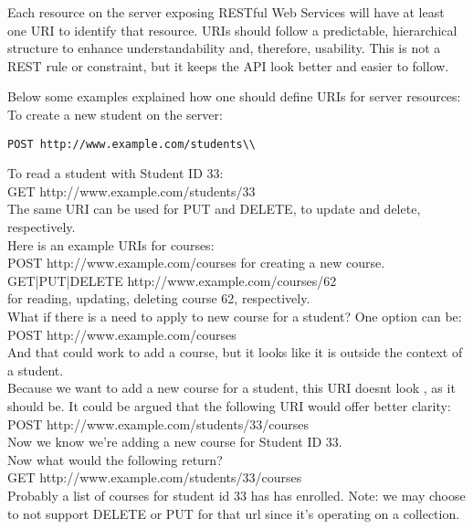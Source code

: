 \hspace*{0.2in}Each resource on the server exposing RESTful Web Services will have at least one URI to identify that resource. URIs should follow a predictable, hierarchical structure to enhance understandability and, therefore, usability. This is not a REST rule or constraint, but it keeps the API look better and easier to follow\cite{restnaming}.


Below some examples explained how one should define URIs for server resources:\\

To create a new student on the server:\\
\begin{lstlisting}[language=command]
	POST http://www.example.com/students\\
\end{lstlisting}

To read a student with Student ID 33:\\
GET http://www.example.com/students/33 \\
The same URI can be used for PUT and DELETE, to update and delete, respectively.\\

Here is an example URIs for courses:\\
POST http://www.example.com/courses for creating a new course.\\

GET|PUT|DELETE http://www.example.com/courses/62\\
for reading, updating, deleting course 62, respectively.\\

What if there is a need to apply to new course for a student? One option can be: \\
POST http://www.example.com/courses \\
And that could work to add a course, but it looks like it is outside the context of a student.\\

Because we want to add a new course for a student, this URI doesnt look , as it should be. It could be argued that the following URI would offer better clarity: \\
POST http://www.example.com/students/33/courses \\
Now we know we're adding a new course for Student ID 33.\\

Now what would the following return?\\
GET http://www.example.com/students/33/courses\\
Probably a list of courses for student id 33 has has enrolled. Note: we may choose to not support DELETE or PUT for that url since it's operating on a collection.\\


